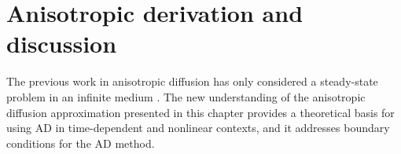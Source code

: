 
\chapter{Anisotropic derivation and discussion}\label{chap:adDerivation}

The previous work in anisotropic diffusion has only considered a steady-state
problem in an infinite medium \cite{Lar2009c,Mor2007}. The new understanding of
the anisotropic diffusion approximation presented in this chapter provides a
theoretical basis for using AD in time-dependent and nonlinear contexts, and it
addresses boundary conditions for the AD method.

